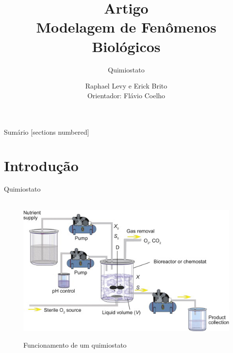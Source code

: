\documentclass[10pt,xcolor=svgnames]{beamer} %
\title{Artigo \\ Modelagem de Fenômenos Biológicos}
\author[Name]{Raphael Levy e Erick Brito \\ Orientador: Flávio Coelho} %
\date{}
\subtitle{Quimiostato}
\institute[uni]{EMAP - FGV}
\begin{document}
{
\maketitle
}%


\begin{frame}{Sumário}
  [sections numbered] %
  \tableofcontents[hideallsubsections] %
\end{frame}




\section{Introdução}

\begin{frame}[fragile]{Quimiostato} %
\begin{figure}[H]
        \centering
        \hbox{\hspace{5.0em} \includegraphics[scale=0.7] {Funcionamento_Quimiostato.jpg}} 
        \caption*{Funcionamento de um quimiostato}
\end{figure}
\end{frame}
\end{document}
